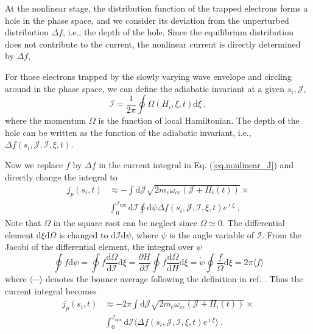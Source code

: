 At the nonlinear stage, the distribution function of the trapped electrons forms a hole in the phase space, and we consider its deviation from the unperturbed distribution $\Delta f$, i.e., the depth of the hole.
Since the equilibrium distribution does not contribute to the current, the nonlinear current is directly determined by $\Delta f$, 

For those electrons trapped by the slowly varying wave envelope and circling around in the phase space, we can define the adiabatic invariant at a given $s_i,\mathcal{J}$,
\begin{equation}\label{eq.def_I}
    \mathcal{I} = \frac{1}{2\pi} \oint \Omega(H_i,\xi,t) \mathrm{d} \xi~,
\end{equation}
where the momentum $\Omega$ is the function of local Hamiltonian.
The depth of the hole can be written as the function of the adiabatic invariant, i.e., $\Delta f(s_i,\mathcal{J},\mathcal{I},\xi,t)$.

Now we replace $f$ by $\Delta f$ in the current integral in Eq. (\ref{eq.nonlinear_J}) and directly change the integral to 
\begin{equation}
\begin{aligned}
    j_p(s_i,t) &\approx - \int\mathrm{d} \mathcal{J} \sqrt{2 m_e \omega_{ce} (\mathcal{J} + \Pi_i(t))} \times
    \\
    &\int_0^{\mathcal{I}_{\mathrm{s p x}}}  \mathrm{d}\mathcal{I}  \oint \mathrm{d}\psi  \Delta f(s_i,\mathcal{J},\mathcal{I},\xi,t)e^{\imath \xi}  ~,
\end{aligned}
\end{equation}
Note that $\Omega$ in the square root can be neglect since $\Omega \simeq 0$.
The differential element $\mathrm{d}\xi\mathrm{d}\Omega$ is changed to $\mathrm{d}\mathcal{I}\mathrm{d}\psi$, where $\psi$ is the angle variable of $\mathcal{I}$.
From the Jacobi of the differential element, the integral over $\psi$ 
\begin{equation}
      \oint f \mathrm{d}\psi = \oint f \frac{\mathrm{d}\Omega}{\mathrm{d}\mathcal{I}}\mathrm{d}\xi = \frac{\partial H}{\partial \mathcal{I}} \oint f \frac{\mathrm{d}\Omega}{\mathrm{d} H}\mathrm{d}\xi = \dot{\psi}\oint \frac{f}{\Omega} \mathrm{d}\xi = 2 \pi \langle f \rangle
\end{equation}
where $\langle\cdots\rangle$ denotes the bounce average following the definition in ref. \cite{berk1999}.
Thus the current integral becomes
\begin{equation}\label{eq.adiabatic_current}
\begin{aligned}
    j_p(s_i,t) & \approx -  {2\pi} \int\mathrm{d} \mathcal{J}  \sqrt{2m_e\omega_{ce} (\mathcal{J} + \Pi_i(t))}  \times 
    \\
    &\int_0^{\mathcal{I}_{\mathrm{s p x}}}\mathrm{d}\mathcal{I}  \langle \Delta f(s_i,\mathcal{J},\mathcal{I},\xi,t)e^{\imath \xi} \rangle  ~.
\end{aligned}
\end{equation}


